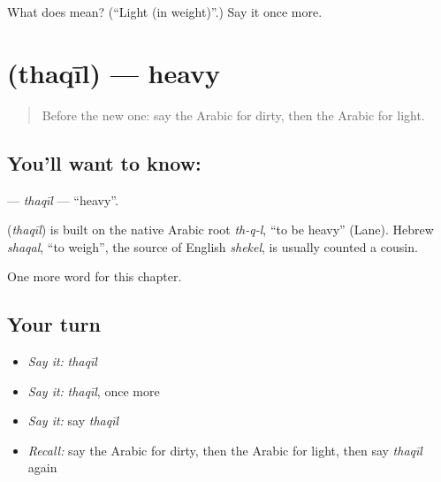 \begin{tcolorbox}[breakable,colback=teal!4,colframe=teal!35!black,title={Before you move on}]
What does  mean? (\textquotedblleft{}Light (in weight)\textquotedblright{}.) Say it once more.
\end{tcolorbox}
\section[\texorpdfstring{\ar{ثقيل} (thaqīl)}{ثقيل (thaqīl)}]{ (thaqīl) — heavy}

\label{lesson:AR-C85-thaqil}



\begin{quote}
Before the new one: say the Arabic for dirty, then the Arabic for light.
\end{quote}

\subsection*{You'll want to know: }
\textbf{} — \emph{thaqīl} — \textquotedblleft{}heavy\textquotedblright{}.

\begin{cousinweb}
\textbf{} (\emph{thaqīl}) is built on the native Arabic root \emph{th-q-l}, \textquotedblleft{}to be heavy\textquotedblright{} (Lane). Hebrew \emph{shaqal}, \textquotedblleft{}to weigh\textquotedblright{}, the source of English \emph{shekel}, is usually counted a cousin.
\end{cousinweb}

\begin{grammarlens}[title={What you've built}]
One more word for this chapter.
\end{grammarlens}

\subsection*{Your turn}
\begin{itemize}
\raggedright
  \item \emph{Say it:} \emph{thaqīl}
  \item \emph{Say it:} \emph{thaqīl}, once more
  \item \emph{Say it:} say \emph{thaqīl}
  \item \emph{Recall:} say the Arabic for dirty, then the Arabic for light, then say \emph{thaqīl} again
\end{itemize}

